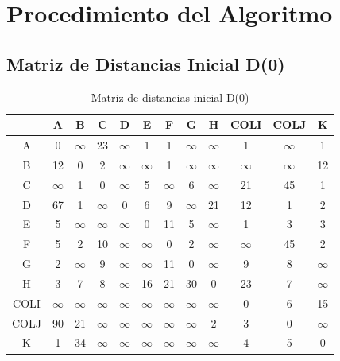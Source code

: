 \documentclass[12pt]{article}
\begin{document}
\clearpage
\section{Procedimiento del Algoritmo}
\subsection{Matriz de Distancias Inicial D(0)}
\begin{table}[h!]
\centering
\begin{tabular}{|c|c|c|c|c|c|c|c|c|c|c|c|}
\hline
 & A & B & C & D & E & F & G & H & COLI & COLJ & K \\\hline
A & 0 & $\infty$ & 23 & $\infty$ & 1 & 1 & $\infty$ & $\infty$ & 1 & $\infty$ & 1 \\\hline
B & 12 & 0 & 2 & $\infty$ & $\infty$ & 1 & $\infty$ & $\infty$ & $\infty$ & $\infty$ & 12 \\\hline
C & $\infty$ & 1 & 0 & $\infty$ & 5 & $\infty$ & 6 & $\infty$ & 21 & 45 & 1 \\\hline
D & 67 & 1 & $\infty$ & 0 & 6 & 9 & $\infty$ & 21 & 12 & 1 & 2 \\\hline
E & 5 & $\infty$ & $\infty$ & $\infty$ & 0 & 11 & 5 & $\infty$ & 1 & 3 & 3 \\\hline
F & 5 & 2 & 10 & $\infty$ & $\infty$ & 0 & 2 & $\infty$ & $\infty$ & 45 & 2 \\\hline
G & 2 & $\infty$ & 9 & $\infty$ & $\infty$ & 11 & 0 & $\infty$ & 9 & 8 & $\infty$ \\\hline
H & 3 & 7 & 8 & $\infty$ & 16 & 21 & 30 & 0 & 23 & 7 & $\infty$ \\\hline
COLI & $\infty$ & $\infty$ & $\infty$ & $\infty$ & $\infty$ & $\infty$ & $\infty$ & $\infty$ & 0 & 6 & 15 \\\hline
COLJ & 90 & 21 & $\infty$ & $\infty$ & $\infty$ & $\infty$ & $\infty$ & 2 & 3 & 0 & $\infty$ \\\hline
K & 1 & 34 & $\infty$ & $\infty$ & $\infty$ & $\infty$ & $\infty$ & $\infty$ & 4 & 5 & 0 \\\hline
\end{tabular}
\caption{Matriz de distancias inicial D(0)}
\end{table}

\clearpage
\end{document}
